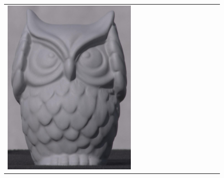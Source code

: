\begin{figure}[!ht]
\begin{tabular}{@{}rcccccccccccc@{}}
    \includegraphics[width=\customwidth]{./figures/reconstruction/object/135615.jpg} &

\end{tabular}
\end{figure}
